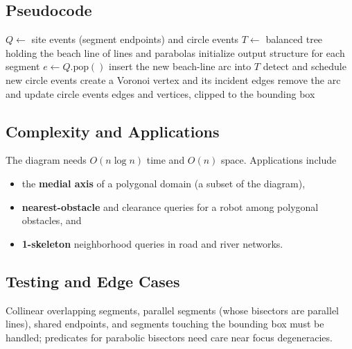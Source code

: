 \subsection{Pseudocode}

\begin{algorithm}[htbp]
\caption{Segment Voronoi Diagram by Plane Sweep}
\label{alg:segment_voronoi}
\begin{algorithmic}[1]
  \State $Q \gets$ site events (segment endpoints) and circle events
  \State $T \gets$ balanced tree holding the beach line of lines and parabolas
  \State initialize output structure for each segment
    \State $e \gets Q.\text{pop}()$
      \State insert the new beach-line arc into $T$
      \State detect and schedule new circle events
    \Else {}
      \State create a Voronoi vertex and its incident edges
      \State remove the arc and update circle events
    \EndIf
  \EndWhile
  \State \Return edges and vertices, clipped to the bounding box
\EndFunction
\end{algorithmic}
\end{algorithm}

\subsection{Complexity and Applications}

The diagram needs $O(n \log n)$ time and $O(n)$ space. Applications include
\begin{itemize}
\item the \textbf{medial axis} of a polygonal domain (a subset of the
  diagram),
\item \textbf{nearest-obstacle} and clearance queries for a robot among
  polygonal obstacles, and
\item \textbf{1-skeleton} neighborhood queries in road and river networks.
\end{itemize}

\subsection{Testing and Edge Cases}

Collinear overlapping segments, parallel segments (whose bisectors are
parallel lines), shared endpoints, and segments touching the bounding box must
be handled; predicates for parabolic bisectors need care near focus
degeneracies.

